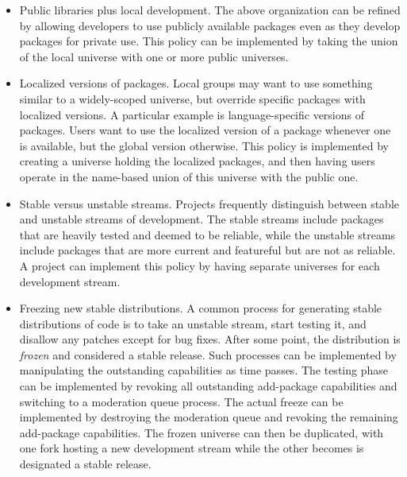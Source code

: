 \documentclass{article}
\begin{document}
\begin{itemize}
\item Public libraries plus local development.  The above organization
      can be refined by allowing developers to use publicly
      available packages even as they develop packages for private
      use.  This policy can be implemented by taking the union of the
      local universe with one or more public universes.


\item Localized versions of packages.  Local groups may want to use
      something similar to a widely-scoped universe, but override
      specific packages with localized versions.  A particular example
      is language-specific versions of packages.  Users want to use
      the localized version of a package whenever one is available,
      but the global version otherwise.  This policy is implemented by
      creating a universe holding the localized packages, and then
      having users operate in the name-based union of this universe
      with the public one.

\item Stable versus unstable streams.  Projects frequently distinguish
      between stable and unstable streams of development.  The stable
      streams include packages that are heavily tested and deemed to
      be reliable, while the unstable streams include packages that
      are more current and featureful but are not as reliable.  A
      project can implement this policy by having separate universes
      for each development stream.  

\item Freezing new stable distributions.  A common process for
      generating stable distributions of code is to take an unstable
      stream, start testing it, and disallow any patches except for
      bug fixes.
      After some
      point, the distribution is \emph{frozen} and considered a stable
      release.  Such processes can be implemented by manipulating the
      outstanding capabilities as time passes.  The testing phase can
      be implemented by revoking all outstanding add-package
      capabilities and switching to a moderation queue process.  The
      actual freeze can be implemented by destroying the moderation
      queue and revoking the remaining add-package capabilities.  The
      frozen universe can then be duplicated, with one fork hosting
      a new development stream while the other becomes is designated
      a stable release.
\end{itemize}
\end{document}
